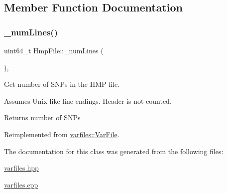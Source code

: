 \subsection{Member Function Documentation}
\mbox{\label{classvarfiles_1_1_hmp_file_a7f349e751b8a95cb1b4ded06eef85af9}} 
\subsubsection{\texorpdfstring{\+\_\+num\+Lines()}{\_numLines()}}
{\footnotesize\ttfamily uint64\+\_\+t Hmp\+File\+::\+\_\+num\+Lines (\begin{DoxyParamCaption}{ }\end{DoxyParamCaption})\hspace{0.3cm}{\ttfamily [protected]}, {\ttfamily [virtual]}}



Get number of S\+N\+Ps in the H\+MP file. 

Assumes Unix-\/like line endings. Header is not counted.

\begin{DoxyReturn}{Returns}
number of S\+N\+Ps 
\end{DoxyReturn}


Reimplemented from \hyperlink{classvarfiles_1_1_var_file_a029a1a5577fb735c338750d2dec62ab6}{varfiles\+::\+Var\+File}.



The documentation for this class was generated from the following files\+:\begin{DoxyCompactItemize}
\item 
\hyperlink{varfiles_8hpp}{varfiles.\+hpp}\item 
\hyperlink{varfiles_8cpp}{varfiles.\+cpp}\end{DoxyCompactItemize}
